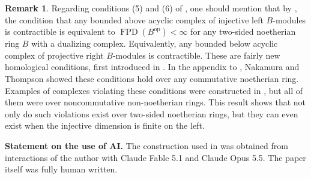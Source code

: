 \documentclass{amsart}
\theoremstyle{definition}
\newtheorem{rem}[equation]{Remark}
\newcommand{\opn}{\operatorname}
\numberwithin{equation}{section}
\begin{document}
\begin{rem}
Regarding conditions (5) and (6) of , 
one should mention that by \cite[Theorem 5.1]{ShGor},
the condition that any bounded above acyclic complex of injective left $B$-modules is contractible is equivalent to $\opn{FPD}(B^{\opn{op}}) < \infty$ for any two-sided noetherian ring $B$ with a dualizing complex. 
Equivalently, any bounded below acyclic complex of projective right $B$-modules is contractible.
These are fairly new homological conditions, first introduced in \cite{ShGor}.
In the appendix to \cite{ShGor},
Nakamura and Thompson showed \cite[Corollary A.2 and Corollary A.8]{ShGor} these conditions hold over any commutative noetherian ring.
Examples of complexes violating these conditions were constructed in \cite{Pos2},
but all of them were over noncommutative non-noetherian rings.
This result shows that not only do such violations exist over two-sided noetherian rings,
but they can even exist when the injective dimension is finite on the left.
\end{rem}


\textbf{Statement on the use of AI.} The construction used in  was obtained from interactions of the author with Claude Fable 5.1 and Claude Opus 5.5.
The paper itself was fully human written.





\end{document}
